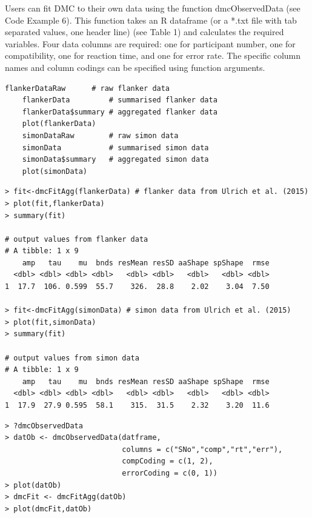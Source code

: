 Users can fit DMC to their own data using the function dmcObservedData (see
Code Example 6). This function takes an R dataframe (or a *.txt file with tab
separated values, one header line) (see Table 1) and calculates the required
variables. Four data columns are required: one for participant number, one for
compatibility, one for reaction time, and one for error rate. The specific
column names and column codings can be specified using function arguments.

\begin{minipage}{\linewidth}
    \begin{lstlisting}[style = R, title = {R Code Example 4}, captionpos = t]
    flankerDataRaw      # raw flanker data
    flankerData         # summarised flanker data
    flankerData$summary # aggregated flanker data
    plot(flankerData)
    simonDataRaw        # raw simon data
    simonData           # summarised simon data
    simonData$summary   # aggregated simon data
    plot(simonData)
    \end{lstlisting}
\end{minipage}

\begin{minipage}{\linewidth}
    \begin{lstlisting}[style = R, title = {R Code Example 5}, captionpos = t]
> fit<-dmcFitAgg(flankerData) # flanker data from Ulrich et al. (2015)
> plot(fit,flankerData)
> summary(fit)

# output values from flanker data
# A tibble: 1 x 9 
    amp   tau    mu  bnds resMean resSD aaShape spShape  rmse
  <dbl> <dbl> <dbl> <dbl>   <dbl> <dbl>   <dbl>   <dbl> <dbl>
1  17.7  106. 0.599  55.7    326.  28.8    2.02    3.04  7.50

> fit<-dmcFitAgg(simonData) # simon data from Ulrich et al. (2015)
> plot(fit,simonData)
> summary(fit)

# output values from simon data
# A tibble: 1 x 9
    amp   tau    mu  bnds resMean resSD aaShape spShape  rmse
  <dbl> <dbl> <dbl> <dbl>   <dbl> <dbl>   <dbl>   <dbl> <dbl>
1  17.9  27.9 0.595  58.1    315.  31.5    2.32    3.20  11.6
    \end{lstlisting}
\end{minipage}



\begin{minipage}{\linewidth}
    \begin{lstlisting}[style = R, title = {R Code Example 6}, captionpos = t]
> ?dmcObservedData
> datOb <- dmcObservedData(datframe, 
                           columns = c("SNo","comp","rt","err"), 
                           compCoding = c(1, 2), 
                           errorCoding = c(0, 1)) 
> plot(datOb)
> dmcFit <- dmcFitAgg(datOb)
> plot(dmcFit,datOb)
    \end{lstlisting}
\end{minipage}


